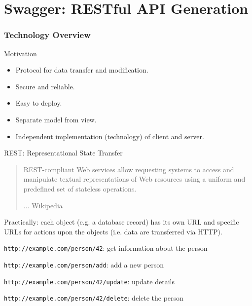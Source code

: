 \part{Swagger: RESTful API Generation}


\section{Technology Overview}


\begin{frame}{Motivation}
    \begin{itemize}
        \item Protocol for data transfer and modification.
        \item Secure and reliable.
        \item Easy to deploy.
        \item Separate model from view.
        \item Independent implementation (technology)
            of client and server.
    \end{itemize}
\end{frame}

\begin{frame}{REST: Representational State Transfer}
    \begin{quotation}
        REST-compliant Web services allow requesting systems to access
        and manipulate textual representations of Web resources using
        a uniform and predefined set of stateless operations.
        
        \hfill ... Wikipedia
    \end{quotation}
    
    \bigskip
    
    Practically: each object (e.g. a database record) has its own URL
    and specific URLs for actions upon the objects
    (i.e. data are transferred via HTTP).
    
    \medskip
    
    \texttt{http://example.com/person/42}: get information about the person
    
    \texttt{http://example.com/person/add}: add a new person
    
    \texttt{http://example.com/person/42/update}: update details
    
    \texttt{http://example.com/person/42/delete}: delete the person
\end{frame}


